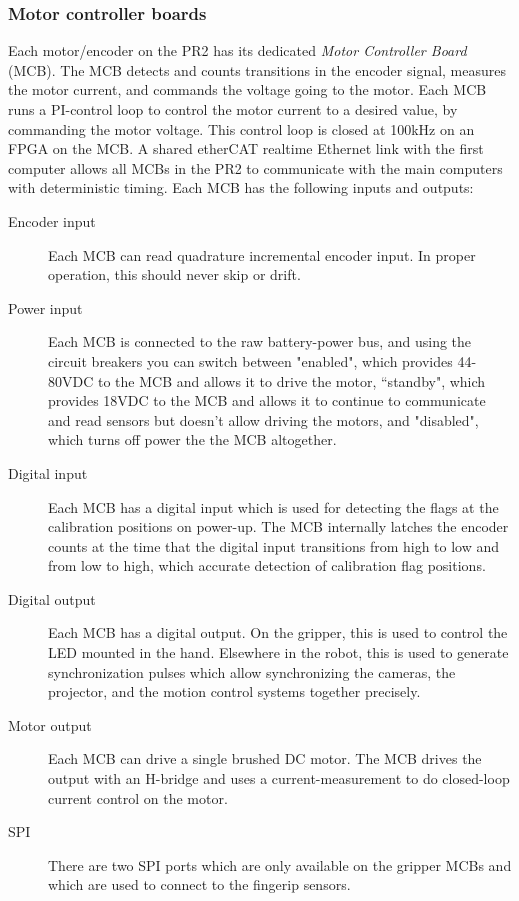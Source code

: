 \subsubsection{Motor controller boards}
Each motor/encoder on the PR2 has its dedicated \emph{Motor Controller Board}
(MCB). The MCB detects and counts transitions in the encoder signal, measures
the motor current, and commands the voltage going to the motor. Each MCB runs a
PI-control loop to control the motor current to a desired value, by commanding
the motor voltage. This control loop is closed at 100kHz on an FPGA on the MCB.  A
shared etherCAT realtime Ethernet link with the first computer allows all MCBs
 in the PR2 to communicate with the main computers with deterministic timing. Each MCB has the following inputs and outputs:
\begin{description}
\item[Encoder input] Each MCB can read quadrature incremental encoder input.  In proper operation, this should never skip or drift.
\item[Power input] Each MCB is connected to the raw battery-power bus, and using the circuit breakers you can switch between "enabled", which provides 44-80VDC
to the MCB and allows it to drive the motor, ``standby", which provides 18VDC to the MCB and allows it to continue to communicate and read sensors but
doesn't allow driving the motors, and "disabled", which turns off power the the MCB altogether.
\item[Digital input] Each MCB has a digital input which is used for detecting the flags at the calibration positions on power-up.  The MCB internally latches the encoder counts at the time that the digital input transitions from high to low and from low to high, which accurate detection of calibration flag positions.
\item[Digital output] Each MCB has a digital output.  On the gripper, this is used to control the LED mounted in the hand.
Elsewhere in the robot, this is used to generate synchronization pulses which allow synchronizing the cameras, the projector,
and the motion control systems together precisely.
\item[Motor output] Each MCB can drive a single brushed DC motor.  The MCB drives the output with an H-bridge and uses a current-measurement to do closed-loop current control on the motor.
\item[SPI] There are two SPI ports which are only available on the gripper MCBs and which are used to connect to the fingerip sensors.
\end{description}

